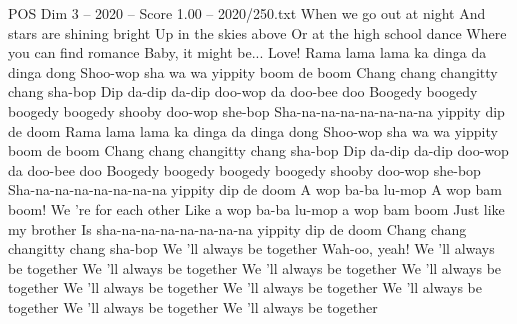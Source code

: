 \begin{textsample}{POS Dim 3 – 2020 – Score 1.00 – 2020/250.txt}
When we go out at night And stars are shining bright Up in the skies above Or at the high school dance Where you can find romance Baby, it might be...
Love!
Rama lama lama ka dinga da dinga dong Shoo-wop sha wa wa yippity boom de boom Chang chang changitty chang sha-bop Dip da-dip da-dip doo-wop da doo-bee doo Boogedy boogedy boogedy boogedy shooby doo-wop she-bop Sha-na-na-na-na-na-na-na yippity dip de doom Rama lama lama ka dinga da dinga dong Shoo-wop sha wa wa yippity boom de boom Chang chang changitty chang sha-bop Dip da-dip da-dip doo-wop da doo-bee doo Boogedy boogedy boogedy boogedy shooby doo-wop she-bop Sha-na-na-na-na-na-na-na yippity dip de doom A wop ba-ba lu-mop A wop bam boom!
We 're for each other Like a wop ba-ba lu-mop a wop bam boom Just like my brother Is sha-na-na-na-na-na-na-na yippity dip de doom Chang chang changitty chang sha-bop We 'll always be together Wah-oo, yeah!
We 'll always be together We 'll always be together We 'll always be together We 'll always be together We 'll always be together We 'll always be together We 'll always be together We 'll always be together We 'll always be together

\end{textsample}
